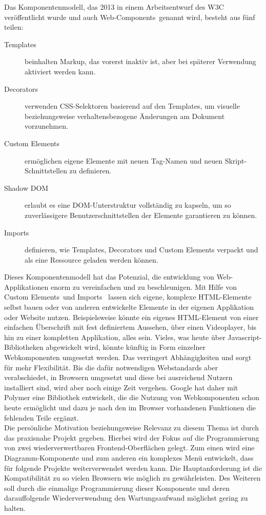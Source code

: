 Das Komponentenmodell, das 2013 in einem Arbeitsentwurf des W3C veröffentlicht wurde und auch \glqq Web-Components\grqq\ genannt wird, besteht aus fünf teilen:
\begin{description}
\item[Templates] beinhalten Markup, das vorerst inaktiv ist, aber bei späterer Verwendung aktiviert werden kann.
\item[Decorators] verwenden CSS-Selektoren basierend auf den Templates, um visuelle beziehungsweise verhaltensbezogene Änderungen am Dokument vorzunehmen.
\item[Custom Elements] ermöglichen eigene Elemente mit neuen Tag-Namen und neuen Skript-Schnittstellen zu definieren.
\item[Shadow DOM] erlaubt es eine DOM-Unterstruktur vollständig zu kapseln, um so zuverlässigere Benutzerschnittstellen der Elemente garantieren zu können.
\item[Imports] definieren, wie Templates, Decorators und Custom Elements verpackt und als eine Ressource geladen werden können.
\end{description}
Dieses Komponentenmodell hat das Potenzial, die entwicklung von Web-Applikationen enorm zu vereinfachen und zu beschleunigen. Mit Hilfe von \glqq Custom Elements\grqq\ und \glqq Imports \grqq\ lassen sich eigene, komplexe HTML-Elemente selbst bauen oder von anderen entwickelte Elemente in der eigenen Applikation oder Website nutzen. Beispielsweise könnte ein eigenes HTML-Element von einer einfachen Überschrift mit fest definiertem Aussehen, über einen Videoplayer, bis hin zu einer kompletten Applikation, alles sein. Vieles, was heute über Javascript-Bibliotheken abgewickelt wird, könnte künftig in Form einzelner Webkomponenten umgesetzt werden. Das verringert Abhängigkeiten und sorgt für mehr Flexibilität. Bis die dafür notwendigen Webstandards aber verabschiedet, in Browsern umgesetzt und diese bei ausreichend Nutzern installiert sind, wird aber noch einige Zeit vergehen. Google hat daher mit Polymer eine Bibliothek entwickelt, die die Nutzung von Webkomponenten schon heute ermöglicht und dazu je nach den im Browser vorhandenen Funktionen die fehlenden Teile ergänzt.\\
Die persönliche Motivation beziehungsweise Relevanz zu diesem Thema ist durch das praxisnahe Projekt gegeben. Hierbei wird der Fokus auf die Programmierung von zwei wiederverwertbaren Frontend-Oberflächen gelegt. Zum einen wird eine Diagramm-Komponente und zum anderen ein komplexes Menü entwickelt, dass für folgende Projekte weiterverwendet werden kann. Die Hauptanforderung ist die Kompatibilität zu so vielen Browsern wie möglich zu gewährleisten. Des Weiteren soll durch die einmalige Programmierung dieser Komponente und deren darauffolgende Wiederverwendung den Wartungsaufwand möglichst gering zu halten.



